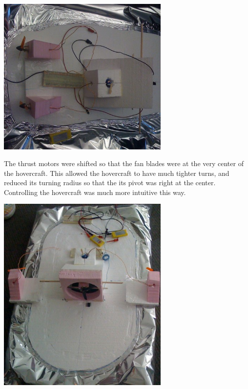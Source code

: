 \begin{minipage}{6.5in}
\begin{center}
  \includegraphics[width=85mm]{imageSources/turningPivot1.png}
\end{center}
\label{turningPivot1}
\end{minipage}

The thrust motors were shifted so that the fan blades were at the very center of the hovercraft. This allowed the hovercraft to have much tighter turns, and reduced its turning radius so that the its pivot was right at the center. Controlling the hovercraft was much more intuitive this way.

\begin{minipage}{6.5in}
\begin{center}
  \includegraphics[width=85mm]{imageSources/turningPivot2.png}
\end{center}
\label{turningPivot2}
\end{minipage}

